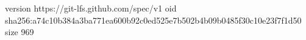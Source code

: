 version https://git-lfs.github.com/spec/v1
oid sha256:a74c10b384a3ba771ea600b92c0ed525e7b502b4b09b0485f30c10e23f7f1d50
size 969
